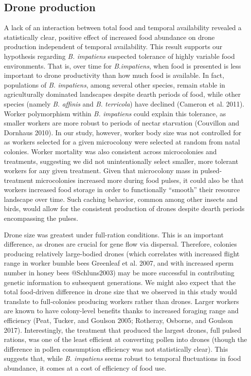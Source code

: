 \documentclass[11pt,]{article}
\begin{document}
\hypertarget{drone-production}{%
\subsection{Drone production}\label{drone-production}}

A lack of an interaction between total food and temporal availability
revealed a statistically clear, positive effect of increased food
abundance on drone production independent of temporal availability. This
result supports our hypothesis regarding \emph{B. impatiens} suspected
tolerance of highly variable food environments. That is, over time for
\emph{B.impatiens}, when food is presented is less important to drone
productivity than how much food is available. In fact, populations of
\emph{B. impatiens}, among several other species, remain stable in
agriculturally dominated landscapes despite dearth periods of food,
while other species (namely \emph{B. affinis} and \emph{B. terricola})
have declined (Cameron et al. 2011). Worker polymorphism within \emph{B.
impatiens} could explain this tolerance, as smaller workers are more
robust to periods of nectar starvation (Couvillon and Dornhaus 2010). In
our study, however, worker body size was not controlled for as workers
selected for a given microcolony were selected at random from natal
colonies. Worker mortality was also consistent across microcolonies and
treatments, suggesting we did not unintentionally select smaller, more
tolerant workers for any given treatment. Given that microcolony mass in
pulsed-treatment microcolonies increased more during food pulses, it
could also be that workers increased food storage in order to
functionally ``smooth'' their resource landscape over time. Such caching
behavior, common among other insects and birds, would allow for the
consistent production of drones despite dearth periods encompassing the
pulses.

Drone size was greatest under full-ration conditions. This is an
important difference, as drones are crucial for gene flow via dispersal.
Therefore, colonies producing relatively large-bodied drones (which
correlates with increased flight range in worker bumble bees Greenleaf
et al. 2007, and with increased sperm number in honey bees @Schluns2003)
may be more successful in contributing genetic information to subsequent
generations. We might also expect that the total food-driven difference
in drone size that we observed in this study would translate to
full-colonies producing workers rather than drones. Larger workers are
known to have colony-level benefits thanks to increased foraging range
and efficiency (Peat, Tucker, and Goulson 2005; Rotheray, Osborne, and
Goulson 2017). Interestingly, the treatment that produced the largest
drones, full pulsed rations, was one of the least efficient at
converting pollen into drones (though the difference in pollen
consumption efficiency was not statistically clear). This suggests that,
while \emph{B. impatiens} seems robust to temporal fluctuations in food
abundance, it comes at a cost of efficiency of food use.
\end{document}
